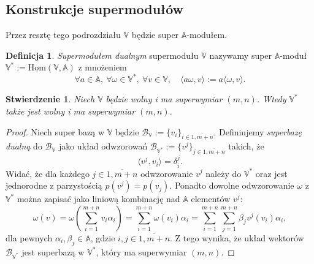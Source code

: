 \documentclass[11pt,a4paper]{report}
\newtheorem{proposition}[theorem]{Stwierdzenie}
\theoremstyle{definition}
\newtheorem{definition}[theorem]{Definicja}
\begin{document}
\subsection{Konstrukcje supermodułów}

Przez resztę tego podrozdziału $\mathbb{V}$ będzie super $\mathbb{A}$-modułem.

\begin{definition} 
	\textit{Supermodułem dualnym} supermodułu $\mathbb{V}$ nazywamy super $\mathbb{A}$-moduł $\mathbb{V}^* := \underline{\mathrm{Hom}}(\mathbb{V},\mathbb{A})$ z mnożeniem
	\begin{equation}
		\label{dual_supermodule_multiplication}
		\forall a \in \mathbb{A},\ \forall \omega \in \mathbb{V}^*,\ \forall v \in \mathbb{V}, \quad \langle a \omega, v \rangle := a \langle \omega , v \rangle.
	\end{equation}
\end{definition}

\begin{proposition}
	Niech $\mathbb{V}$ będzie wolny i ma superwymiar $(m,n)$. Wtedy $\mathbb{V}^*$ także jest wolny i ma superwymiar $(m,n)$.
\end{proposition}

\begin{proof}
	Niech super bazą w $\mathbb{V}$ będzie $\mathcal{B}_\mathbb{V} := \{ v_i \}_{i \in \overline{1,m+n}}$. Definiujemy \textit{superbazę dualną} do $\mathcal{B}_\mathbb{V}$ jako układ odwzorowań $\mathcal{B}_{\mathbb{V}^*}:=\{ v^j\}_{j \in \overline{1,m+n}}$ takich, że 
	\begin{equation*}
		\langle v^j, v_i \rangle = \delta^j_i.
	\end{equation*}
	Widać, że dla każdego $j \in \overline{1,m+n}$ odwzorowanie $v^j$ należy do $\mathbb{V^*}$ oraz jest jednorodne z parzystością $p(v^j) = p(v_j)$. Ponadto dowolne odwzorowanie $\omega$ z $\mathbb{V^*}$ można zapisać jako liniową kombinację nad $\mathbb{A}$ elementów $v^j$:
	\begin{equation*}
		\omega(v) = \omega \left( \sum^{m+n}_{i=1} v_i \alpha_i \right) = \sum^{m+n}_{i=1} \omega(v_i) \alpha_i = \sum^{m+n}_{i=1} \sum^{m+n}_{j=1} \beta_j v^j(v_i) \alpha_i,
	\end{equation*}
	dla pewnych $\alpha_i, \beta_j \in \mathbb{A}$, gdzie $i,j \in \overline{1,m+n}.$ Z tego wynika, że układ wektorów $\mathcal{B}_{\mathbb{V}^*}$ jest superbazą w $\mathbb{V}^*$, który ma superwymiar $(m,n)$.
\end{proof}
\end{document}
